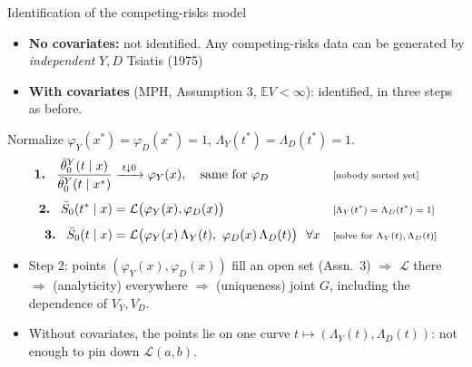 \documentclass[aspectratio=169,10pt]{beamer}
\newcommand{\E}{\mathbb{E}}
\newcommand{\Lap}{\mathcal{L}}
\newcommand{\why}[1]{\text{\scriptsize[#1]}}
\begin{document}
\begin{frame}[label=m-ts]{Identification of the competing-risks model}
  \begin{itemize}
    \item \textbf{No covariates:} not identified. Any competing-risks data can be generated by \emph{independent} $Y,D$ \hfill{\small Tsiatis (1975)}
    \item \textbf{With covariates} (MPH, Assumption 3, $\E V<\infty$): identified, in three steps as before.
  \end{itemize}
  Normalize $\varphi_Y(x^*)=\varphi_D(x^*)=1$, $\Lambda_Y(t^*)=\Lambda_D(t^*)=1$.
  \begin{align*}
    \textbf{1. }\ \frac{\bar\theta^Y_0(t\mid x)}{\bar\theta^Y_0(t\mid x^*)} &\xrightarrow{\;t\downarrow0\;}\varphi_Y(x),\quad\text{same for }\varphi_D && \why{nobody sorted yet} \\[4pt]
    \textbf{2. }\ \bar S_0(t^*\mid x) &= \Lap\big(\varphi_Y(x),\varphi_D(x)\big) && \why{$\Lambda_Y(t^*)=\Lambda_D(t^*)=1$} \\[4pt]
    \textbf{3. }\ \bar S_0(t\mid x) &= \Lap\big(\varphi_Y(x)\,\Lambda_Y(t),\ \varphi_D(x)\,\Lambda_D(t)\big)\ \ \forall x && \why{solve for $\Lambda_Y(t),\Lambda_D(t)$}
  \end{align*}
  \begin{itemize}
    \item Step 2: points $(\varphi_Y(x),\varphi_D(x))$ fill an open set (Assn.~3) $\Rightarrow$ $\Lap$ there $\Rightarrow$ (analyticity) everywhere $\Rightarrow$ (uniqueness) joint $G$, including the dependence of $V_Y,V_D$.
    \item Without covariates, the points lie on one curve $t\mapsto(\Lambda_Y(t),\Lambda_D(t))$: not enough to pin down $\Lap(a,b)$.
  \end{itemize}
  \vfill\hfill\hyperlink{p-ts}{}
\end{frame}

\end{document}
